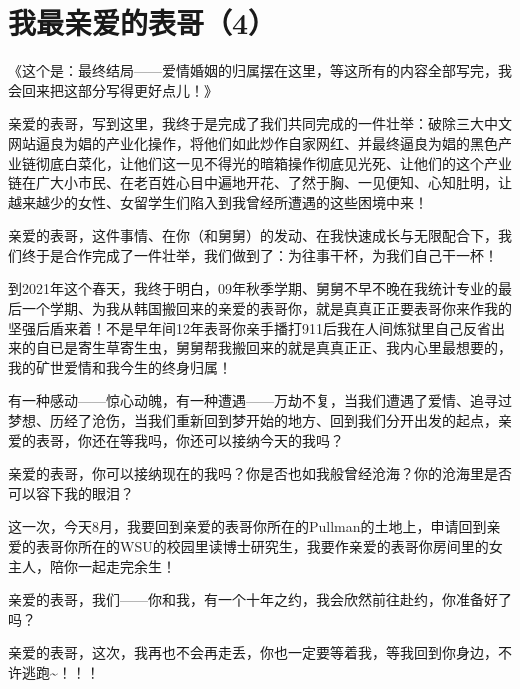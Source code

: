 \documentclass[9pt, b5paper]{article}
\begin{document}
\section{我最亲爱的表哥（4）}
\label{sec:org3faa6ca}

《这个是：最终结局——爱情婚姻的归属摆在这里，等这所有的内容全部写完，我会回来把这部分写得更好点儿！》

亲爱的表哥，写到这里，我终于是完成了我们共同完成的一件壮举：破除三大中文网站逼良为娼的产业化操作，将他们如此炒作自家网红、并最终逼良为娼的黑色产业链彻底白菜化，让他们这一见不得光的暗箱操作彻底见光死、让他们的这个产业链在广大小市民、在老百姓心目中遍地开花、了然于胸、一见便知、心知肚明，让越来越少的女性、女留学生们陷入到我曾经所遭遇的这些困境中来！

亲爱的表哥，这件事情、在你（和舅舅）的发动、在我快速成长与无限配合下，我们终于是合作完成了一件壮举，我们做到了：为往事干杯，为我们自己干一杯！

到2021年这个春天，我终于明白，09年秋季学期、舅舅不早不晚在我统计专业的最后一个学期、为我从韩国搬回来的亲爱的表哥你，就是真真正正要表哥你来作我的坚强后盾来着！不是早年间12年表哥你亲手播打911后我在人间炼狱里自己反省出来的自已是寄生草寄生虫，舅舅帮我搬回来的就是真真正正、我内心里最想要的，我的矿世爱情和我今生的终身归属！

有一种感动——惊心动魄，有一种遭遇——万劫不复，当我们遭遇了爱情、追寻过梦想、历经了沧伤，当我们重新回到梦开始的地方、回到我们分开出发的起点，亲爱的表哥，你还在等我吗，你还可以接纳今天的我吗？

亲爱的表哥，你可以接纳现在的我吗？你是否也如我般曾经沧海？你的沧海里是否可以容下我的眼泪？

这一次，今天8月，我要回到亲爱的表哥你所在的Pullman的土地上，申请回到亲爱的表哥你所在的WSU的校园里读博士研究生，我要作亲爱的表哥你房间里的女主人，陪你一起走完余生！

亲爱的表哥，我们——你和我，有一个十年之约，我会欣然前往赴约，你准备好了吗？

亲爱的表哥，这次，我再也不会再走丢，你也一定要等着我，等我回到你身边，不许逃跑\textasciitilde{}！！！
\end{document}

